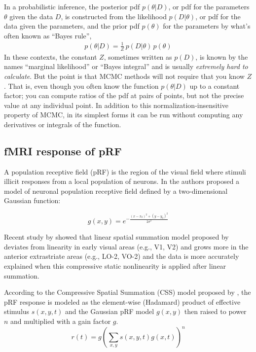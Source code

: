 \documentclass[review]{elsarticle}
\newcommand{\given}{|}
\newcommand{\data}{D}
\newcommand{\pars}{\theta}
\begin{document}
In a probabilistic inference, the posterior pdf $p(\pars\given\data)$,
or pdf for the parameters $\pars$ given the data $\data$, is
constructed from the likelihood $p(\data\given\pars)$, or pdf for the
data given the parameters, and the prior pdf $p(\pars)$ for the
parameters by what's often known as ``Bayes rule'',
\begin{eqnarray}
p(\pars\given\data) = \frac{1}{Z}\,p(\data\given\pars)\,p(\pars)
\label{eq:bayes}
\end{eqnarray}
In these contexts, the constant $Z$, sometimes written as
$p(\data)$, is known by the names ``marginal likelihood'' or
``Bayes integral'' and is usually \emph{extremely hard to calculate}. But the point is that MCMC methods will not require that you know $Z$.
That is, even though you often know the function $p(\pars\given\data)$ up to a
constant factor; you can compute ratios of the pdf at pairs of points, but not the precise value at any individual point. In addition to this normalization-insensitive property of MCMC, in its simplest forms it can be run without computing any derivatives or integrals of the function.



\subsection{fMRI response of pRF}
A population receptive field (pRF) is the region of the visual field where stimuli illicit responses from a local population of neurons. In \cite{Dumoulin2008} the authors proposed a model of neuronal population receptive field defined by a two-dimensional Gaussian function:

\begin{equation}
g(x, y) = e^{-\frac{(x-x_0)^2+(y-y_0)^2}{2\sigma^2}}
\end{equation}

Recent study by \cite{Kay2013} showed that linear spatial summation model proposed by \cite{Dumoulin2008} deviates from linearity in early visual areas (e.g., V1, V2) and grows more in the anterior extrastriate areas (e.g., LO-2, VO-2) and the data is more accurately explained when this compressive static nonlinearity is applied after linear summation.

According to the Compressive Spatial Summation (CSS) model proposed by \cite{Kay2013}, the pRF response is modeled as the element-wise (Hadamard) product of effective stimulus $s(x, y, t)$ and the Gaussian pRF model $g(x, y)$ then raised to power $n$ and multiplied with a gain factor $g$.
\begin{equation}
r(t) = g (\sum_{x, y} s(x, y, t) g(x, t))^n
\end{equation}
\end{document}
